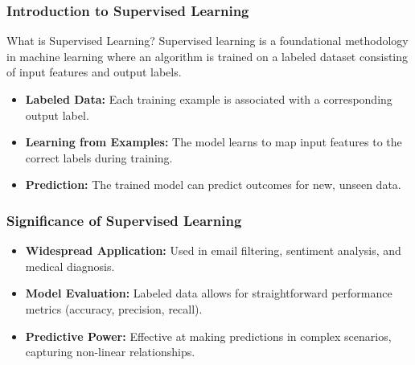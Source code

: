 \documentclass[aspectratio=169]{beamer}
\begin{document}
\frame{\titlepage}

\begin{frame}[fragile]
    \frametitle{Introduction to Supervised Learning}
    \begin{block}{What is Supervised Learning?}
        Supervised learning is a foundational methodology in machine learning where an algorithm is trained on a labeled dataset consisting of input features and output labels.
    \end{block}
    \begin{itemize}
        \item \textbf{Labeled Data:} Each training example is associated with a corresponding output label.
        \item \textbf{Learning from Examples:} The model learns to map input features to the correct labels during training.
        \item \textbf{Prediction:} The trained model can predict outcomes for new, unseen data.
    \end{itemize}
\end{frame}

\begin{frame}[fragile]
    \frametitle{Significance of Supervised Learning}
    \begin{itemize}
        \item \textbf{Widespread Application:} Used in email filtering, sentiment analysis, and medical diagnosis.
        \item \textbf{Model Evaluation:} Labeled data allows for straightforward performance metrics (accuracy, precision, recall).
        \item \textbf{Predictive Power:} Effective at making predictions in complex scenarios, capturing non-linear relationships.
    \end{itemize}
\end{frame}
\end{document}
